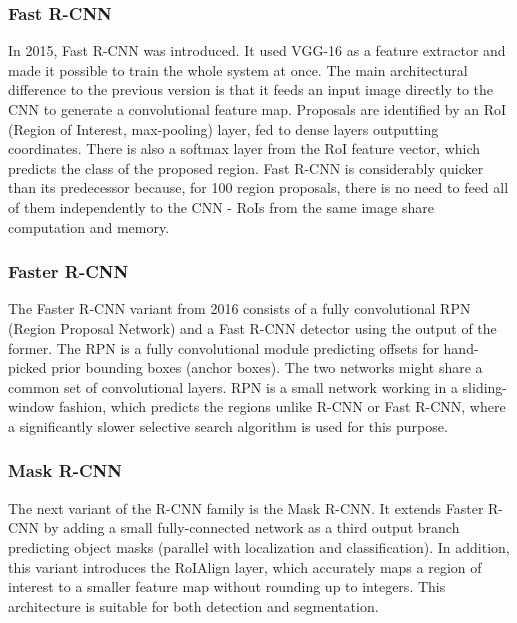 \subsubsection{Fast R-CNN}

In 2015, Fast R-CNN\cite{FastR-CNN} was introduced. It used VGG-16 as a feature extractor and made it possible to train the whole system at once. The main architectural difference to the previous version is that it feeds an input image directly to the CNN to generate a convolutional feature map. Proposals are identified by an RoI (Region of Interest, max-pooling) layer, fed to dense layers outputting coordinates. There is also a softmax layer from the RoI feature vector, which predicts the class of the proposed region. Fast R-CNN is considerably quicker than its predecessor because, for 100 region proposals, there is no need to feed all of them independently to the CNN - RoIs from the same image share computation and memory.

\subsubsection{Faster R-CNN}

The Faster R-CNN\cite{FasterR-CNN} variant from 2016 consists of a fully convolutional RPN (Region Proposal Network) and a Fast R-CNN detector using the output of the former. The RPN is a fully convolutional module predicting offsets for hand-picked prior bounding boxes (anchor boxes). The two networks might share a common set of convolutional layers. RPN is a small network working in a sliding-window fashion, which predicts the regions unlike R-CNN or Fast R-CNN, where a significantly slower selective search algorithm is used for this purpose.

\subsubsection{Mask R-CNN}

The next variant of the R-CNN family is the Mask R-CNN\cite{MaskR-CNN}. It extends Faster R-CNN by adding a small fully-connected network as a third output branch predicting object masks (parallel with localization and classification). In addition, this variant introduces the RoIAlign layer, which accurately maps a region of interest to a smaller feature map without rounding up to integers. This architecture is suitable for both detection and segmentation.

